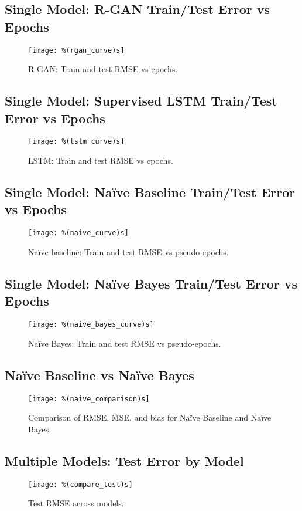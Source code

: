 \documentclass[11pt]{article}
\begin{document}
\subsection{Single Model: R-GAN Train/Test Error vs Epochs}
\begin{figure}[h]
\centering
\texttt{[image: \%(rgan\_curve)s]}
\caption{R-GAN: Train and test RMSE vs epochs.}
\end{figure}

\subsection{Single Model: Supervised LSTM Train/Test Error vs Epochs}
\begin{figure}[h]
\centering
\texttt{[image: \%(lstm\_curve)s]}
\caption{LSTM: Train and test RMSE vs epochs.}
\end{figure}

\subsection{Single Model: Naïve Baseline Train/Test Error vs Epochs}
\begin{figure}[h]
\centering
\texttt{[image: \%(naive\_curve)s]}
\caption{Naïve baseline: Train and test RMSE vs pseudo-epochs.}
\end{figure}

\subsection{Single Model: Naïve Bayes Train/Test Error vs Epochs}
\begin{figure}[h]
\centering
\texttt{[image: \%(naive\_bayes\_curve)s]}
\caption{Naïve Bayes: Train and test RMSE vs pseudo-epochs.}
\end{figure}

\subsection{Naïve Baseline vs Naïve Bayes}
\begin{figure}[h]
\centering
\texttt{[image: \%(naive\_comparison)s]}
\caption{Comparison of RMSE, MSE, and bias for Naïve Baseline and Naïve Bayes.}
\end{figure}

\subsection{Multiple Models: Test Error by Model}
\begin{figure}[h]
\centering
\texttt{[image: \%(compare\_test)s]}
\caption{Test RMSE across models.}
\end{figure}
\end{document}
